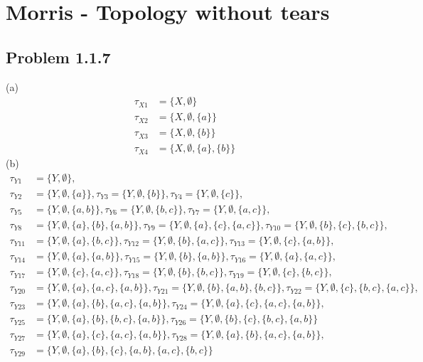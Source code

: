 \documentclass[10pt,a4paper]{book}
\theoremstyle{definition}
\begin{document}
\section{{\sc Morris} - Topology without tears}
\subsection{Problem 1.1.7}
(a) 
\begin{align}
\tau_{X1}&=\{X,\emptyset\}\\
\tau_{X2}&=\{X,\emptyset,\{a\}\}\\
\tau_{X3}&=\{X,\emptyset,\{b\}\}\\
\tau_{X4}&=\{X,\emptyset,\{a\},\{b\}\}
\end{align}
(b) 
\begin{align}
\tau_{Y1}&=\{Y,\emptyset\},\\
%
\tau_{Y2}&=\{Y,\emptyset,\{a\}\},\tau_{Y3}=\{Y,\emptyset,\{b\}\},\tau_{Y4}=\{Y,\emptyset,\{c\}\},\\
%
\tau_{Y5}&=\{Y,\emptyset,\{a,b\}\},\tau_{Y6}=\{Y,\emptyset,\{b,c\}\},\tau_{Y7}=\{Y,\emptyset,\{a,c\}\},\\
%
\tau_{Y8}&=\{Y,\emptyset,\{a\},\{b\},\{a,b\}\},
\tau_{Y9}=\{Y,\emptyset,\{a\},\{c\},\{a,c\}\},
\tau_{Y10}=\{Y,\emptyset,\{b\},\{c\},\{b,c\}\},\\
%
\tau_{Y11}&=\{Y,\emptyset,\{a\},\{b,c\}\},
\tau_{Y12}=\{Y,\emptyset,\{b\},\{a,c\}\},
\tau_{Y13}=\{Y,\emptyset,\{c\},\{a,b\}\},\\
%
\tau_{Y14}&=\{Y,\emptyset,\{a\},\{a,b\}\},
\tau_{Y15}=\{Y,\emptyset,\{b\},\{a,b\}\},
\tau_{Y16}=\{Y,\emptyset,\{a\},\{a,c\}\},\\
%
\tau_{Y17}&=\{Y,\emptyset,\{c\},\{a,c\}\},
\tau_{Y18}=\{Y,\emptyset,\{b\},\{b,c\}\},
\tau_{Y19}=\{Y,\emptyset,\{c\},\{b,c\}\},\\
%
\tau_{Y20}&=\{Y,\emptyset,\{a\},\{a,c\},\{a,b\}\},
\tau_{Y21}=\{Y,\emptyset,\{b\},\{a,b\},\{b,c\}\},
\tau_{Y22}=\{Y,\emptyset,\{c\},\{b,c\},\{a,c\}\},\\
%
\tau_{Y23}&=\{Y,\emptyset,\{a\},\{b\},\{a,c\},\{a,b\}\},
\tau_{Y24}=\{Y,\emptyset,\{a\},\{c\},\{a,c\},\{a,b\}\},\\
%
\tau_{Y25}&=\{Y,\emptyset,\{a\},\{b\},\{b,c\},\{a,b\}\},
\tau_{Y26}=\{Y,\emptyset,\{b\},\{c\},\{b,c\},\{a,b\}\}\\
%
\tau_{Y27}&=\{Y,\emptyset,\{a\},\{c\},\{a,c\},\{a,b\}\},
\tau_{Y28}=\{Y,\emptyset,\{a\},\{b\},\{a,c\},\{a,b\}\},\\
%
\tau_{Y29}&=\{Y,\emptyset,\{a\},\{b\},\{c\},\{a,b\},\{a,c\},\{b,c\}\}
\end{align}
\end{document}
